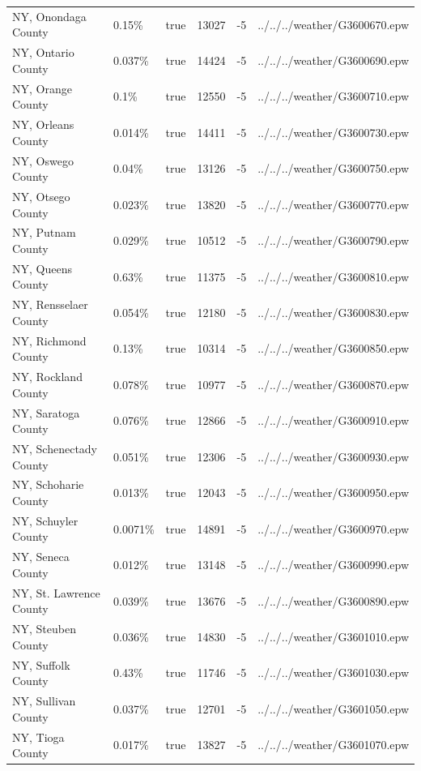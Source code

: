 \begin{longtable}[]{@{}llllll@{}}
NY, Onondaga County & 0.15\% & true & 13027 & -5 &
../../../weather/G3600670.epw \\
NY, Ontario County & 0.037\% & true & 14424 & -5 &
../../../weather/G3600690.epw \\
NY, Orange County & 0.1\% & true & 12550 & -5 &
../../../weather/G3600710.epw \\
NY, Orleans County & 0.014\% & true & 14411 & -5 &
../../../weather/G3600730.epw \\
NY, Oswego County & 0.04\% & true & 13126 & -5 &
../../../weather/G3600750.epw \\
NY, Otsego County & 0.023\% & true & 13820 & -5 &
../../../weather/G3600770.epw \\
NY, Putnam County & 0.029\% & true & 10512 & -5 &
../../../weather/G3600790.epw \\
NY, Queens County & 0.63\% & true & 11375 & -5 &
../../../weather/G3600810.epw \\
NY, Rensselaer County & 0.054\% & true & 12180 & -5 &
../../../weather/G3600830.epw \\
NY, Richmond County & 0.13\% & true & 10314 & -5 &
../../../weather/G3600850.epw \\
NY, Rockland County & 0.078\% & true & 10977 & -5 &
../../../weather/G3600870.epw \\
NY, Saratoga County & 0.076\% & true & 12866 & -5 &
../../../weather/G3600910.epw \\
NY, Schenectady County & 0.051\% & true & 12306 & -5 &
../../../weather/G3600930.epw \\
NY, Schoharie County & 0.013\% & true & 12043 & -5 &
../../../weather/G3600950.epw \\
NY, Schuyler County & 0.0071\% & true & 14891 & -5 &
../../../weather/G3600970.epw \\
NY, Seneca County & 0.012\% & true & 13148 & -5 &
../../../weather/G3600990.epw \\
NY, St. Lawrence County & 0.039\% & true & 13676 & -5 &
../../../weather/G3600890.epw \\
NY, Steuben County & 0.036\% & true & 14830 & -5 &
../../../weather/G3601010.epw \\
NY, Suffolk County & 0.43\% & true & 11746 & -5 &
../../../weather/G3601030.epw \\
NY, Sullivan County & 0.037\% & true & 12701 & -5 &
../../../weather/G3601050.epw \\
NY, Tioga County & 0.017\% & true & 13827 & -5 &
../../../weather/G3601070.epw \\

\end{longtable}
